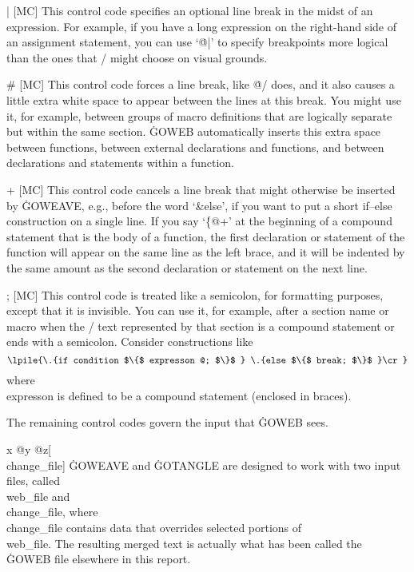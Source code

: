 \@| [MC] This control code specifies an optional line break in the midst of
an expression. For example, if you have
a long expression on the right-hand side of an assignment
statement, you can use `\.{@|}' to specify breakpoints more logical than
the ones that \TEX/ might choose on visual grounds.

\@\# [MC] This control code forces a line break, like \.{@/} does,
and it also causes a little extra white space to appear between the lines at
this break. You might use it, for example,
between groups of macro definitions that are logically separate but within
the same section. \.{GOWEB} automatically inserts this extra space
between functions, between external declarations and functions, and
between declarations and statements within a function.

\@+ [MC] This control code cancels a line break that might otherwise be
inserted by \.{GOWEAVE}, e.g., before the word `\&{else}', if you want to
put a short if--else construction on a single line.
If you say `\.{\{@+}' at the beginning of a compound statement
that is the body of a function, the first declaration or
statement of the function will appear on the same line as the
left brace, and it will be indented by the same amount as the
second declaration or statement on the next line.

\@; [MC] This control code is treated like a semicolon, for formatting
purposes, except that it is invisible. You can use it, for example, after
a section name or macro when the \GO/ text represented by that section
is a compound statement or ends
with a semicolon. Consider constructions like
$$\lpile{\.{if condition $\{$ expresson @; $\}$  } 
\.{else $\{$ break; $\}$ }\cr}$$
where \\{expresson} is defined to be a compound statement (enclosed in braces).

\subsec
The remaining control codes govern the input that \.{GOWEB} sees.

\@{x @y @z}[\\{change\_file}]
\.{GOWEAVE} and \.{GOTANGLE} are designed to work with two input files,
called \\{web\_file} and \\{change\_file}, where \\{change\_file} contains
data that overrides selected portions of \\{web\_file}. The resulting merged
text is actually what has been called the \.{GOWEB} file elsewhere in this
report.

